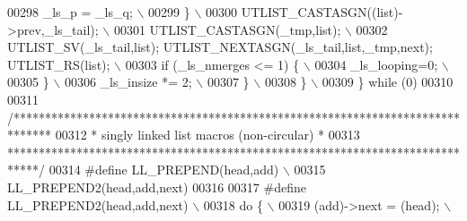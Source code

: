 \begin{DoxyCode}
00298 \textcolor{preprocessor}{        \_ls\_p = \_ls\_q;                                                                         \(\backslash\)}
00299 \textcolor{preprocessor}{      \}                                                                                        \(\backslash\)}
00300 \textcolor{preprocessor}{      UTLIST\_CASTASGN((list)->prev,\_ls\_tail);                                                  \(\backslash\)}
00301 \textcolor{preprocessor}{      UTLIST\_CASTASGN(\_tmp,list);                                                              \(\backslash\)}
00302 \textcolor{preprocessor}{      UTLIST\_SV(\_ls\_tail,list); UTLIST\_NEXTASGN(\_ls\_tail,list,\_tmp,next); UTLIST\_RS(list);     \(\backslash\)}
00303 \textcolor{preprocessor}{      if (\_ls\_nmerges <= 1) \{                                                                  \(\backslash\)}
00304 \textcolor{preprocessor}{        \_ls\_looping=0;                                                                         \(\backslash\)}
00305 \textcolor{preprocessor}{      \}                                                                                        \(\backslash\)}
00306 \textcolor{preprocessor}{      \_ls\_insize *= 2;                                                                         \(\backslash\)}
00307 \textcolor{preprocessor}{    \}                                                                                          \(\backslash\)}
00308 \textcolor{preprocessor}{  \}                                                                                            \(\backslash\)}
00309 \textcolor{preprocessor}{\} while (0)}
00310 
00311 \textcolor{comment}{/******************************************************************************}
00312 \textcolor{comment}{ * singly linked list macros (non-circular)                                   *}
00313 \textcolor{comment}{ *****************************************************************************/}
00314 \textcolor{preprocessor}{#define LL\_PREPEND(head,add)                                                                   \(\backslash\)}
00315 \textcolor{preprocessor}{    LL\_PREPEND2(head,add,next)}
00316 
00317 \textcolor{preprocessor}{#define LL\_PREPEND2(head,add,next)                                                             \(\backslash\)}
00318 \textcolor{preprocessor}{do \{                                                                                           \(\backslash\)}
00319 \textcolor{preprocessor}{  (add)->next = (head);                                                                        \(\backslash\)}

\end{DoxyCode}
